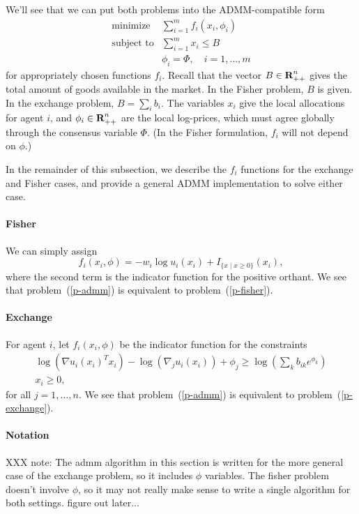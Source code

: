 \documentclass[12pt]{article}
\begin{document}
We'll see that we can put both problems into the ADMM-compatible form
\begin{equation}
\label{p-admm}
\begin{array}{ll}
\mbox{minimize} & \sum_{i=1}^m f_i(x_i, \phi_i) \\
\mbox{subject to} & \sum_{i=1}^m x_i \leq B\\
& \phi_i = \Phi, \quad i=1,\ldots,m
\end{array}
\end{equation}
for appropriately chosen functions $f_i$.
Recall that the vector $B \in {\mbox{\bf R}}^n_{++}$ gives the total
amount of goods available in the market. In the Fisher problem,
$B$ is given.
In the exchange problem, $B = \sum_i b_i$.
The variables $x_i$ give the local allocations for agent $i$, and
$\phi_i \in {\mbox{\bf R}}^n_{++}$
are the local log-prices, which must agree globally through the
consensus variable $\Phi$.
(In the Fisher formulation, $f_i$ will not depend on $\phi$.)

In the remainder of this subsection, we describe the $f_i$ functions for the exchange and Fisher cases, and provide a general
ADMM implementation to solve either case.

\paragraph{Fisher}
We can simply assign
\[
f_i(x_i, \phi) = -w_i \log u_i(x_i) + I_{\lbrace x \mid x \geq 0 \rbrace}(x_i),
\]
where the second term is the indicator function for the positive orthant.
We see that problem~(\ref{p-admm}) is equivalent to
problem~(\ref{p-fisher}).

\paragraph{Exchange}

For agent $i$, let $f_i(x_i, \phi)$ be the indicator function for the
constraints
\[
\begin{array}{c}
\log(\nabla u_i(x_i)^T x_i) - \log(\nabla_j u_i(x_i)) + \phi_j \geq  \log\left(\sum_k b_{ik} e^{\phi_{k}}\right)\\
x_i \geq 0,
\end{array}
\]
for all $j=1,\ldots,n$.
We see that problem~(\ref{p-admm}) is equivalent to problem~(\ref{p-exchange}).


\paragraph{Notation}
XXX note: The admm algorithm in this section is written for the more general case of 
the exchange problem, so it includes $\phi$ variables.
The fisher problem doesn't involve $\phi$, so it may not really make sense
to write a single algorithm for both settings. figure out later...
\end{document}
